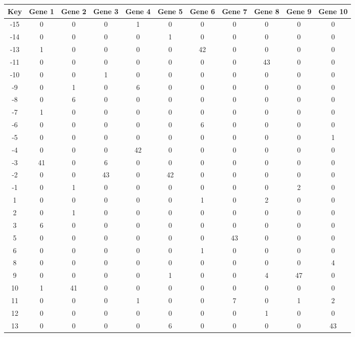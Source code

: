 \begin{tabular}{|c|c|c|c|c|c|c|c|c|c|c|}
\hline
Key & Gene 1 & Gene 2 & Gene 3 & Gene 4 & Gene 5 & Gene 6 & Gene 7 & Gene 8 & Gene 9 & Gene 10 \\
\hline
-15 & 0 & 0 & 0 & 1 & 0 & 0 & 0 & 0 & 0 & 0 \\
-14 & 0 & 0 & 0 & 0 & 1 & 0 & 0 & 0 & 0 & 0 \\
-13 & 1 & 0 & 0 & 0 & 0 & 42 & 0 & 0 & 0 & 0 \\
-11 & 0 & 0 & 0 & 0 & 0 & 0 & 0 & 43 & 0 & 0 \\
-10 & 0 & 0 & 1 & 0 & 0 & 0 & 0 & 0 & 0 & 0 \\
-9 & 0 & 1 & 0 & 6 & 0 & 0 & 0 & 0 & 0 & 0 \\
-8 & 0 & 6 & 0 & 0 & 0 & 0 & 0 & 0 & 0 & 0 \\
-7 & 1 & 0 & 0 & 0 & 0 & 0 & 0 & 0 & 0 & 0 \\
-6 & 0 & 0 & 0 & 0 & 0 & 6 & 0 & 0 & 0 & 0 \\
-5 & 0 & 0 & 0 & 0 & 0 & 0 & 0 & 0 & 0 & 1 \\
-4 & 0 & 0 & 0 & 42 & 0 & 0 & 0 & 0 & 0 & 0 \\
-3 & 41 & 0 & 6 & 0 & 0 & 0 & 0 & 0 & 0 & 0 \\
-2 & 0 & 0 & 43 & 0 & 42 & 0 & 0 & 0 & 0 & 0 \\
-1 & 0 & 1 & 0 & 0 & 0 & 0 & 0 & 0 & 2 & 0 \\
1 & 0 & 0 & 0 & 0 & 0 & 1 & 0 & 2 & 0 & 0 \\
2 & 0 & 1 & 0 & 0 & 0 & 0 & 0 & 0 & 0 & 0 \\
3 & 6 & 0 & 0 & 0 & 0 & 0 & 0 & 0 & 0 & 0 \\
5 & 0 & 0 & 0 & 0 & 0 & 0 & 43 & 0 & 0 & 0 \\
6 & 0 & 0 & 0 & 0 & 0 & 1 & 0 & 0 & 0 & 0 \\
8 & 0 & 0 & 0 & 0 & 0 & 0 & 0 & 0 & 0 & 4 \\
9 & 0 & 0 & 0 & 0 & 1 & 0 & 0 & 4 & 47 & 0 \\
10 & 1 & 41 & 0 & 0 & 0 & 0 & 0 & 0 & 0 & 0 \\
11 & 0 & 0 & 0 & 1 & 0 & 0 & 7 & 0 & 1 & 2 \\
12 & 0 & 0 & 0 & 0 & 0 & 0 & 0 & 1 & 0 & 0 \\
13 & 0 & 0 & 0 & 0 & 6 & 0 & 0 & 0 & 0 & 43 \\
\hline
\end{tabular}